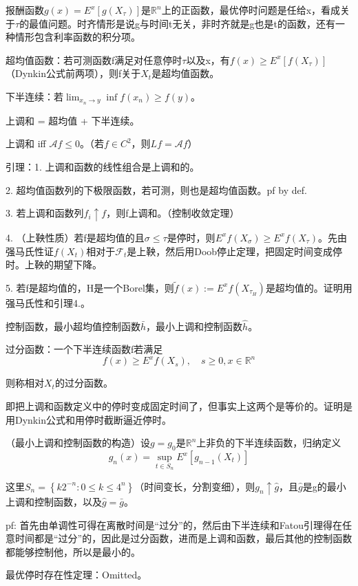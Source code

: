 报酬函数$g(x) = E^x[g(X_\tau)]$是$\mathbb{R}^n$上的正函数，最优停时问题是任给x，看成关于$\tau$的最值问题。时齐情形是说g与时间t无关，非时齐就是g也是t的函数，还有一种情形包含利率函数的积分项。

超均值函数：若可测函数f满足对任意停时$\tau$以及x，有$f(x) \ge E^x[f(X_\tau)]$（Dynkin公式前两项），则f关于$X_t$是超均值函数。

下半连续：若$\lim_{x_n \to y} \inf f(x_n) \ge f(y)$。

上调和 = 超均值 + 下半连续。

上调和 iff $\mathcal{A}f \le 0$。（若$f \in C^2$，则$Lf = \mathcal{A}f$）

引理：1. 上调和函数的线性组合是上调和的。

2. 超均值函数列的下极限函数，若可测，则也是超均值函数。pf by def.

3. 若上调和函数列$f_i \uparrow f$，则f上调和。（控制收敛定理）

4. （上鞅性质）若f是超均值的且$\sigma \leq \tau$是停时，则$E^{x} f\left(X_{\sigma}\right) \geq E^{x} f\left(X_{\tau}\right)$。先由强马氏性证$f(X_t)$相对于$\mathcal{F}_t$是上鞅，然后用Doob停止定理，把固定时间变成停时。上鞅的期望下降。

5. 若f是超均值的，H是一个Borel集，则$\tilde{f}(x):=E^{x} f\left(X_{\tau_{H}}\right)$是超均值的。证明用强马氏性和引理4.。

控制函数，最小超均值控制函数$\bar{h}$，最小上调和控制函数$\widehat{h}$。

过分函数：一个下半连续函数f若满足
\[
  f(x) \geq E^{x} f\left(X_{s}\right), \quad s \geq 0, x \in \mathbb{R}^{n}
\]

则称相对$X_t$的过分函数。

即把上调和函数定义中的停时变成固定时间了，但事实上这两个是等价的。证明是用Dynkin公式和用停时截断逼近停时。

（最小上调和控制函数的构造）设$g=g_{0}$是$\mathbb{R}^{n}$上非负的下半连续函数，归纳定义
\[
  g_{n}(x)=\sup _{t \in S_{n}} E^{x}\left[g_{n-1}\left(X_{t}\right)\right]
\]

这里$S_{n}=\left\{k 2^{-n}: 0 \leq k \leq 4^{n}\right\}$（时间变长，分割变细），则$g_{n} \uparrow \widehat{g}$，且$\widehat{g}$是g的最小上调和控制函数，以及$\widehat{g}=\bar{g}$。

pf: 首先由单调性可得在离散时间是“过分”的，然后由下半连续和Fatou引理得在任意时间都是“过分”的，因此是过分函数，进而是上调和函数，最后其他的控制函数都能够控制他，所以是最小的。

最优停时存在性定理：Omitted。


